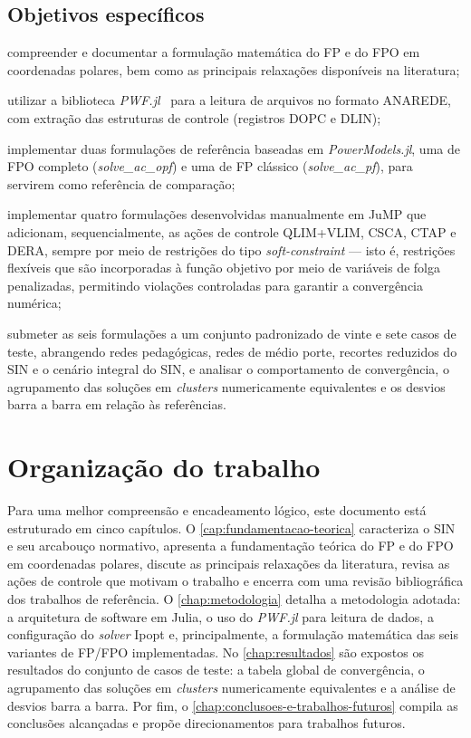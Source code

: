 \subsection{Objetivos específicos}
\label{subsec:obj-especificos}

\begin{alineascomponto}
    \item compreender e documentar a formulação matemática do FP e do FPO em coordenadas polares, bem como as principais relaxações disponíveis na literatura;
    \item utilizar a biblioteca \textit{PWF.jl}~\cite{pwfjl} para a leitura de arquivos no formato ANAREDE, com extração das estruturas de controle (registros DOPC e DLIN);
    \item implementar duas formulações de referência baseadas em \textit{PowerModels.jl}, uma de FPO completo (\textit{solve\_ac\_opf}) e uma de FP clássico (\textit{solve\_ac\_pf}), para servirem como referência de comparação;
    \item implementar quatro formulações desenvolvidas manualmente em JuMP que adicionam, sequencialmente, as ações de controle QLIM+VLIM, CSCA, CTAP e DERA, sempre por meio de restrições do tipo \textit{soft-constraint} --- isto é, restrições flexíveis que são incorporadas à função objetivo por meio de variáveis de folga penalizadas, permitindo violações controladas para garantir a convergência numérica;
    \item submeter as seis formulações a um conjunto padronizado de vinte e sete casos de teste, abrangendo redes pedagógicas, redes de médio porte, recortes reduzidos do SIN e o cenário integral do SIN, e analisar o comportamento de convergência, o agrupamento das soluções em \textit{clusters} numericamente equivalentes e os desvios barra a barra em relação às referências.
\end{alineascomponto}

\section{Organização do trabalho}
\label{sec:organizacao}

Para uma melhor compreensão e encadeamento lógico, este documento está estruturado em cinco capítulos. O \autoref{cap:fundamentacao-teorica} caracteriza o SIN e seu arcabouço normativo, apresenta a fundamentação teórica do FP e do FPO em coordenadas polares, discute as principais relaxações da literatura, revisa as ações de controle que motivam o trabalho e encerra com uma revisão bibliográfica dos trabalhos de referência. O \autoref{chap:metodologia} detalha a metodologia adotada: a arquitetura de software em Julia, o uso do \textit{PWF.jl} para leitura de dados, a configuração do \textit{solver} Ipopt e, principalmente, a formulação matemática das seis variantes de FP/FPO implementadas. No \autoref{chap:resultados} são expostos os resultados do conjunto de casos de teste: a tabela global de convergência, o agrupamento das soluções em \textit{clusters} numericamente equivalentes e a análise de desvios barra a barra. Por fim, o \autoref{chap:conclusoes-e-trabalhos-futuros} compila as conclusões alcançadas e propõe direcionamentos para trabalhos futuros.
